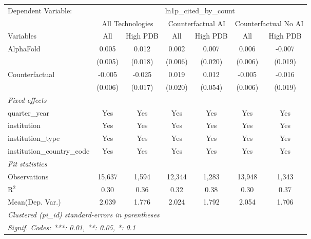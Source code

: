 \begingroup
\centering
\begin{tabular}{lcccccc}
   \tabularnewline \midrule \midrule
   Dependent Variable: & \multicolumn{6}{c}{ln1p\_cited\_by\_count}\\
 & \multicolumn{2}{c}{All Technologies} & \multicolumn{2}{c}{Counterfactual AI} & \multicolumn{2}{c}{Counterfactual No AI} \\
\cmidrule(lr){1-1}\cmidrule(lr){2-3} \cmidrule(lr){4-5} \cmidrule(lr){6-7}
Variables & \multicolumn{1}{c}{All} & \multicolumn{1}{c}{High PDB} & \multicolumn{1}{c}{All} & \multicolumn{1}{c}{High PDB} & \multicolumn{1}{c}{All} & \multicolumn{1}{c}{High PDB} \\
\cmidrule(lr){1-1}\cmidrule(lr){2-2} \cmidrule(lr){3-3} \cmidrule(lr){4-4} \cmidrule(lr){5-5} \cmidrule(lr){6-6} \cmidrule(lr){7-7}
   AlphaFold                    & 0.005   & 0.012   & 0.002   & 0.007   & 0.006   & -0.007\\   
                                & (0.005) & (0.018) & (0.006) & (0.020) & (0.006) & (0.019)\\   
   Counterfactual               & -0.005  & -0.025  & 0.019   & 0.012   & -0.005  & -0.016\\   
                                & (0.006) & (0.017) & (0.020) & (0.054) & (0.006) & (0.019)\\   
   \midrule
   \emph{Fixed-effects}\\
   quarter\_year                & Yes     & Yes     & Yes     & Yes     & Yes     & Yes\\  
   institution                  & Yes     & Yes     & Yes     & Yes     & Yes     & Yes\\  
   institution\_type            & Yes     & Yes     & Yes     & Yes     & Yes     & Yes\\  
   institution\_country\_code   & Yes     & Yes     & Yes     & Yes     & Yes     & Yes\\  
   \midrule
   \emph{Fit statistics}\\
   Observations                 & 15,637  & 1,594   & 12,344  & 1,283   & 13,948  & 1,343\\  
   R$^2$                        & 0.30    & 0.36    & 0.32    & 0.38    & 0.30    & 0.37\\  
Mean(Dep. Var.) & 2.039 & 1.776 & 2.024 & 1.792 & 2.054 & 1.706 \\
   \midrule \midrule
   \multicolumn{7}{l}{\emph{Clustered (pi\_id) standard-errors in parentheses}}\\
   \multicolumn{7}{l}{\emph{Signif. Codes: ***: 0.01, **: 0.05, *: 0.1}}\\
\end{tabular}
\par\endgroup
